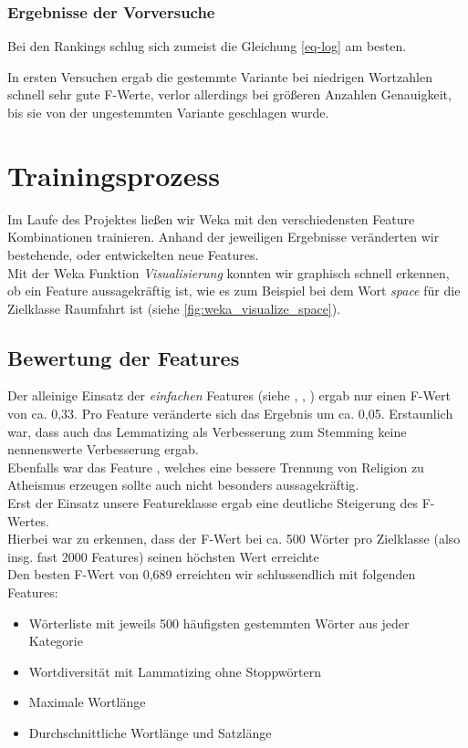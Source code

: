 \documentclass[
	11pt,
	a4paper
]{scrartcl}
\begin{document}
\subsubsection{Ergebnisse der Vorversuche}

Bei den Rankings schlug sich zumeist die Gleichung \ref{eq-log} am besten.

In ersten Versuchen ergab die gestemmte Variante bei niedrigen Wortzahlen schnell sehr gute F-Werte, verlor allerdings bei größeren Anzahlen Genauigkeit, bis sie von der ungestemmten Variante geschlagen wurde.

\section{Trainingsprozess}\label{trainingsprozess}
Im Laufe des Projektes ließen wir Weka mit den verschiedensten Feature Kombinationen trainieren. Anhand der jeweiligen Ergebnisse
veränderten wir bestehende, oder entwickelten neue Features.\\
Mit der Weka Funktion \emph{Visualisierung} konnten wir graphisch schnell erkennen, ob ein Feature aussagekräftig ist, wie es zum
Beispiel bei dem Wort \emph{space} für die Zielklasse Raumfahrt ist (siehe \autoref{fig:weka_visualize_space}).

\subsection{Bewertung der Features}
Der alleinige Einsatz der \emph{einfachen} Features (siehe \emph{}, \emph{},
\emph{}) ergab nur einen F-Wert von ca. 0,33. Pro Feature veränderte sich das Ergebnis um ca. 0,05. Erstaunlich
war, dass auch das Lemmatizing als Verbesserung zum Stemming keine nennenswerte Verbesserung ergab.\\
Ebenfalls war das Feature \emph{}, welches eine bessere Trennung von Religion zu Atheismus erzeugen sollte auch nicht
besonders aussagekräftig.\\
Erst der Einsatz unsere Featureklasse \emph{} ergab eine deutliche Steigerung des F-Wertes.\\
Hierbei war zu erkennen, dass der F-Wert bei ca. 500 Wörter pro Zielklasse (also insg. fast 2000 Features) seinen höchsten Wert erreichte\\

Den besten F-Wert von 0,689 erreichten wir schlussendlich mit folgenden Features:
\begin{itemize}[itemsep=0pt,parsep=0pt, topsep=0pt]
	\item Wörterliste mit jeweils 500 häufigsten gestemmten Wörter aus jeder Kategorie
	\item Wortdiversität mit Lammatizing ohne Stoppwörtern
	\item Maximale Wortlänge
	\item Durchschnittliche Wortlänge und Satzlänge
\end{itemize}
\end{document}
